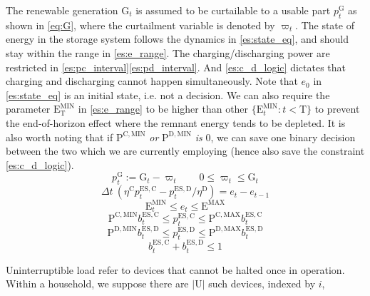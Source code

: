 \documentclass[journal]{IEEEtran}
\begin{document}
The renewable generation $\mathrm{G}_t$ is assumed to be curtailable to
a usable part $p^\mathrm{G}_t$ as shown in \eqref{eq:G}, where the curtailment variable is
denoted by $\varpi_t$.
The state of energy in the storage system follows the dynamics in \eqref{es:state_eq},
and should stay within the range in \eqref{es:e_range}.
The charging/discharging power are restricted in \eqref{es:pc_interval}\eqref{es:pd_interval}.
And \eqref{es:c_d_logic} dictates that charging and discharging cannot happen simultaneously.
Note that $e_0$ in \eqref{es:state_eq} is an initial state, i.e. not a decision.
We can also require the parameter $\mathrm{E}^\mathrm{MIN}_\mathrm{T}$ in \eqref{es:e_range} to be
higher than other $\{\mathrm{E}^\mathrm{MIN}_t: t < \mathrm{T}\}$ to prevent the end-of-horizon
effect where the remnant energy tends to be depleted.
It is also worth noting that if
$\mathrm{P}^\mathrm{C, MIN}$ \textit{or} $\mathrm{P}^\mathrm{D, MIN}$ \textit{is} $0$,
we can save one binary decision between the two which we are currently employing
(hence also save the constraint \eqref{es:c_d_logic}).
\begin{equation}\label{eq:G}
    p^\mathrm{G}_t := \mathrm{G}_t - \varpi_t \qquad 0 \le \varpi_t \le \mathrm{G}_t
\end{equation}
\begin{equation}\label{es:state_eq}
    \Delta t \: (\eta^\mathrm{C} p^\mathrm{ES, C}_t - p^\mathrm{ES, D}_t/\eta^\mathrm{D}) = e_t - e_{t-1}
\end{equation}
\begin{equation}\label{es:e_range}
    \mathrm{E}^\mathrm{MIN}_t \le e_t \le \mathrm{E}^\mathrm{MAX}
\end{equation}
\begin{equation}\label{es:pc_interval}
    \mathrm{P}^\mathrm{C, MIN} b_t^\mathrm{ES, C} \le p^\mathrm{ES, C}_t \le \mathrm{P}^\mathrm{C, MAX} b_t^\mathrm{ES, C}
\end{equation}
\begin{equation}\label{es:pd_interval}
    \mathrm{P}^\mathrm{D, MIN} b_t^\mathrm{ES, D} \le p^\mathrm{ES, D}_t \le \mathrm{P}^\mathrm{D, MAX} b_t^\mathrm{ES, D}
\end{equation}
\begin{equation}\label{es:c_d_logic}
    b_t^\mathrm{ES, C} + b_t^\mathrm{ES, D} \le 1
\end{equation}
\par
Uninterruptible load refer to devices that cannot be halted once in operation.
Within a household, we suppose there are $|\textrm{U}|$ such devices, indexed by $i$,
\end{document}
